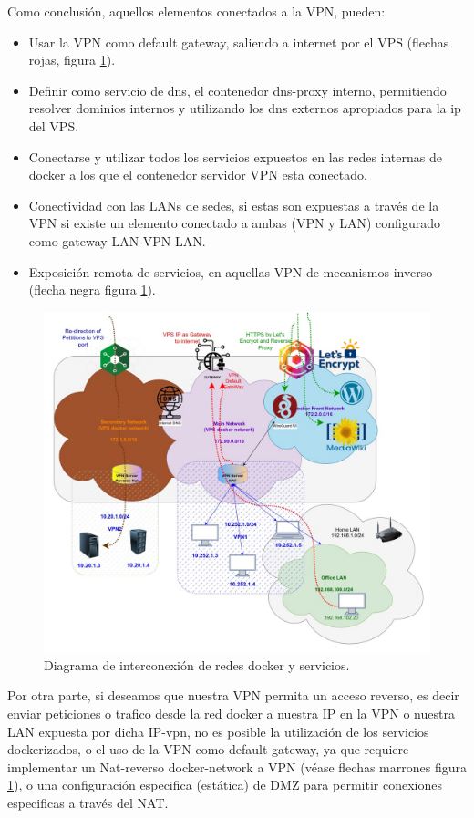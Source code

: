 Como conclusión, aquellos elementos conectados a la VPN, pueden:
\begin{itemize}
    \item Usar la VPN como default gateway, saliendo a internet por el VPS (flechas rojas, figura \ref{F:entorno-dockerNetworks}).
    \item Definir como servicio de dns, el contenedor dns-proxy interno, permitiendo resolver dominios internos y utilizando los dns externos apropiados para la ip del VPS.
    \item Conectarse y utilizar todos los servicios expuestos en las redes internas de docker a los que el contenedor servidor VPN esta conectado.
    \item Conectividad con las LANs de sedes, si estas son expuestas a través de la VPN si existe un elemento conectado a ambas (VPN y LAN) configurado como gateway LAN-VPN-LAN.
    \item Exposición remota de servicios, en aquellas VPN de mecanismos inverso (flecha negra figura \ref{F:entorno-dockerNetworks}).
\end{itemize}
\begin{figure}[!htb]
\begin{center}
\includegraphics[width=1\textwidth]{./figuras/entorno-dockerNetworks.jpg}
\caption{Diagrama de interconexión de redes docker y servicios.}
\label{F:entorno-dockerNetworks}
\end{center}
\end{figure}
Por otra parte, si deseamos que nuestra VPN permita un acceso reverso, es decir enviar peticiones o trafico desde la red docker a nuestra IP en la VPN o nuestra LAN expuesta por dicha IP-vpn, no es posible la utilización de los servicios dockerizados, o el uso de la VPN como default gateway, ya que requiere implementar un Nat-reverso docker-network a VPN (véase flechas marrones figura \ref{F:entorno-dockerNetworks}),
o una configuración especifica (estática) de DMZ para permitir conexiones especificas a través del NAT.

